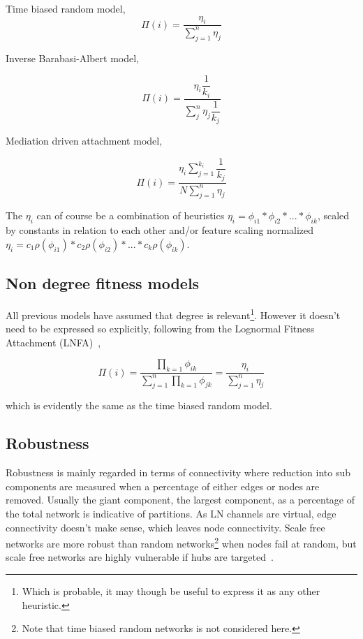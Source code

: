 Time biased random model,
~
\[ \Pi(i) = \dfrac{\eta_i}{\sum_{j=1}^{n} \eta_j} \]

Inverse Barabasi-Albert model,

\[ \Pi(i) =  \dfrac{\eta_i\dfrac{1}{k_i}}{\sum_{j}^{n}\eta_j \dfrac{1}{k_j}} \]

Mediation driven attachment model,

\[ \Pi(i) = \dfrac{\eta_i\sum_{j=1}^{k_i}\dfrac{1}{k_j}}{N\sum_{j=1}^{n}\eta_j} \]

The $\eta_i$ can of course be a combination of heuristics $\eta_i = \phi_{i1} * \phi_{i2} * ... * \phi_{ik}$, scaled by constants in relation to each other and/or feature scaling normalized $\eta_i = c_1\rho(\phi_{i1}) * c_2\rho(\phi_{i2}) * ... * c_k\rho(\phi_{ik})$.

\subsection{Non degree fitness models}

All previous models have assumed that degree is relevant\footnote{Which is probable, it may though be useful to express it as any other heuristic.}. However it doesn't need to be expressed so explicitly, following from the Lognormal Fitness Attachment (LNFA)~\cite{bell:logonormal},

\[ \Pi(i) = \dfrac{\prod_{k=1}\phi_{ik}}{\sum_{j=1}^n\prod_{k=1} \phi_{jk}} = \dfrac{\eta_i}{\sum_{j=1}^{n} \eta_j} \]

which is evidently the same as the time biased random model. 

\vspace*{-0.3cm}

\subsection{Robustness}

Robustness is mainly regarded in terms of connectivity where reduction into sub components are measured when a percentage of either edges or nodes are removed. Usually the giant component, the largest component, as a percentage of the total network is indicative of partitions. As LN channels are virtual, edge connectivity doesn't make sense, which leaves \gls{node} connectivity. Scale free networks are more robust than random networks\footnote{Note that time biased random networks is not considered here.} when nodes fail at random, but scale free networks are highly vulnerable if hubs are targeted~\cite{barabasi:robustness}. 


